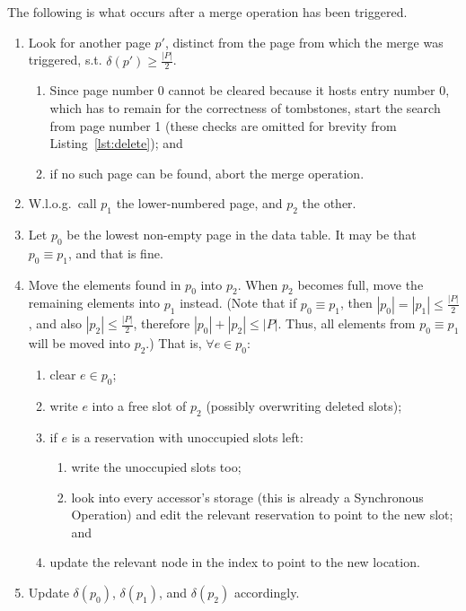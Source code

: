 The following is what occurs after a merge operation has been triggered.
\begin{enumerate}
    \item Look for another page $p'$, distinct from the page from which the merge was triggered, s.t. $\delta(p') \geq \frac{|P|}{2}$.
    \begin{enumerate}
        \item Since page number 0 cannot be cleared because it hosts entry number 0, which has to remain for the correctness of tombstones, start the search from page number 1 (these checks are omitted for brevity from Listing~\ref{lst:delete}); and
        \item if no such page can be found, abort the merge operation.
    \end{enumerate}
    \item W.l.o.g.\ call $p_1$ the lower-numbered page, and $p_2$ the other.
    \item Let $p_0$ be the lowest non-empty page in the data table.
    It may be that $p_0 \equiv p_1$, and that is fine.
    \item Move the elements found in $p_0$ into $p_2$.
    When $p_2$ becomes full, move the remaining elements into $p_1$ instead.
    (Note that if $p_0 \equiv p_1$, then $|p_0| = |p_1| \leq \frac{|P|}{2}$, and also $|p_2| \leq \frac{|P|}{2}$, therefore $|p_0| + |p_2| \leq |P|$.
    Thus, all elements from $p_0 \equiv p_1$ will be moved into $p_2$.)
    That is, $\forall e \in p_0$:
    \begin{enumerate}
        \item clear $e \in p_0$;
        \item write $e$ into a free slot of $p_2$ (possibly overwriting deleted slots);
        \item if $e$ is a reservation with unoccupied slots left:
        \begin{enumerate}
            \item write the unoccupied slots too;
            \item look into every accessor's storage (this is already a Synchronous Operation) and edit the relevant reservation to point to the new slot; and
        \end{enumerate}
        \item update the relevant node in the index to point to the new location.
    \end{enumerate}
    \item Update $\delta(p_0)$, $\delta(p_1)$, and $\delta(p_2)$ accordingly.
\end{enumerate}

